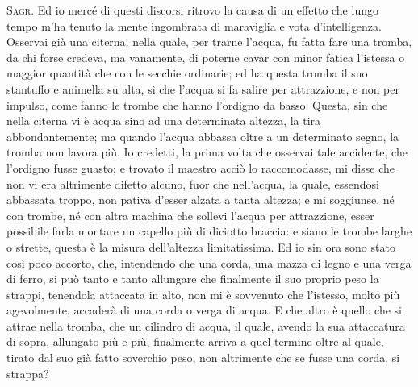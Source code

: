 \documentclass[11pt,twoside,openany]{book}
\newcommand{\speaker}[1]{\textcolor{rubric}{\textsc{#1}}\space}
\begin{document}
\speaker{Sagr.} Ed io mercé di questi discorsi ritrovo la causa di un effetto che lungo tempo m'ha tenuto la mente ingombrata di maraviglia e vota d'intelligenza. Osservai già una citerna, nella quale, per trarne l'acqua, fu fatta fare una tromba, da chi forse credeva, ma vanamente, di poterne cavar con minor fatica l'istessa o maggior quantità che con le secchie ordinarie; ed ha questa tromba il suo stantuffo e animella su alta, sì che l'acqua si fa salire per attrazzione, e non per impulso, come fanno le trombe che hanno l'ordigno da basso. Questa, sin che nella citerna vi è acqua sino ad una determinata altezza, la tira abbondantemente; ma quando l'acqua abbassa oltre a un determinato segno, la tromba non lavora più. Io credetti, la prima volta che osservai tale accidente, che l'ordigno fusse guasto; e trovato il maestro acciò lo raccomodasse, mi disse che non vi era altrimente difetto alcuno, fuor che nell'acqua, la quale, essendosi abbassata troppo, non pativa d'esser alzata a tanta altezza; e mi soggiunse, né con trombe, né con altra machina che sollevi l'acqua per attrazzione, esser possibile farla montare un capello più di diciotto braccia: e siano le trombe larghe o strette, questa è la misura dell'altezza limitatissima. Ed io sin ora sono stato così poco accorto, che, intendendo che una corda, una mazza di legno e una verga di ferro, si può tanto e tanto allungare che finalmente il suo proprio peso la strappi, tenendola attaccata in alto, non mi è sovvenuto che l'istesso, molto più agevolmente, accaderà di una corda o verga di acqua. E che altro è quello che si attrae nella tromba, che un cilindro di acqua, il quale, avendo la sua attaccatura di sopra, allungato più e più, finalmente arriva a quel termine oltre al quale, tirato dal suo già fatto soverchio peso, non altrimente che se fusse una corda, si strappa?
\end{document}
